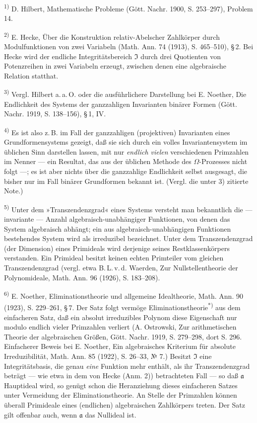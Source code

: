 {\small
\setlength{\parindent}{0pt}
\noindent\textsuperscript{1)} D. Hilbert, Mathematische Probleme (Gött. Nachr. 1900, S. 253--297), Problem 14.

\noindent\textsuperscript{2)} E. Hecke, Über die Konstruktion relativ-Abelscher Zahlkörper durch Modulfunktionen von zwei Variabeln (Math. Ann. 74 (1913), S. 465--510), \S\,2. Bei Hecke wird der endliche Integritätsbereich $\mathfrak{I}$ durch drei Quotienten von Potenzreihen in zwei Variabeln erzeugt, zwischen denen eine algebraische Relation statthat.

\noindent\textsuperscript{3)} Vergl. Hilbert a.\,a.\,O. oder die ausführlichere Darstellung bei E. Noether, Die Endlichkeit des Systems der ganzzahligen Invarianten binärer Formen (Gött. Nachr. 1919, S. 138--156), \S\,1, IV.

\noindent\textsuperscript{4)} Es ist also z.\,B. im Fall der ganzzahligen (projektiven) Invarianten eines Grundformensystems gezeigt, daß sie sich durch ein volles Invariantensystem im üblichen Sinn darstellen lassen, mit nur \emph{endlich vielen} verschiedenen Primzahlen im Nenner --- ein Resultat, das aus der üblichen Methode des $\Omega$-Prozesses nicht folgt ---; es ist aber nichts über die ganzzahlige Endlichkeit selbst ausgesagt, die bisher nur im Fall binärer Grundformen bekannt ist. (Vergl. die unter 3) zitierte Note.)

\noindent\textsuperscript{5)} Unter dem »Transzendenzgrad« eines Systems versteht man bekanntlich die --- invariante --- Anzahl algebraisch-unabhängiger Funktionen, von denen das System algebraisch abhängt; ein aus algebraisch-unabhängigen Funktionen bestehendes System wird als irreduzibel bezeichnet. Unter dem Transzendenzgrad (der Dimension) eines Primideals wird derjenige seines Restklassenkörpers verstanden. Ein Primideal besitzt keinen echten Primteiler vom gleichen Transzendenzgrad (vergl. etwa B.\,L.\,v.\,d. Waerden, Zur Nullstellentheorie der Polynomideale, Math. Ann. 96 (1926), S. 183--208).

\noindent\textsuperscript{6)} E. Noether, Eliminationstheorie und allgemeine Idealtheorie, Math. Ann. 90 (1923), S. 229--261, \S\,7. Der Satz folgt vermöge Eliminationstheorie\textsuperscript{*)} aus dem einfacheren Satz, daß ein absolut irreduzibles Polynom diese Eigenschaft nur modulo endlich vieler Primzahlen verliert (A. Ostrowski, Zur arithmetischen Theorie der algebraischen Größen, Gött. Nachr. 1919, S. 279--298, dort S. 296. Einfacherer Beweis bei E. Noether, Ein algebraisches Kriterium für absolute Irreduzibilität, Math. Ann. 85 (1922), S. 26--33, № 7.) Besitzt $\mathfrak{I}$ eine Integritätsbasis, die genau \emph{eine} Funktion mehr enthält, als ihr Transzendenzgrad beträgt --- wie etwa in dem von Hecke (Anm. 2)) betrachteten Fall --- so daß $\mathfrak{a}$ Hauptideal wird, so genügt schon die Heranziehung dieses einfacheren Satzes unter Vermeidung der Eliminationstheorie. An Stelle der Primzahlen können überall Primideale eines (endlichen) algebraischen Zahlkörpers treten. Der Satz gilt offenbar auch, wenn $\mathfrak{a}$ das Nullideal ist.

}
